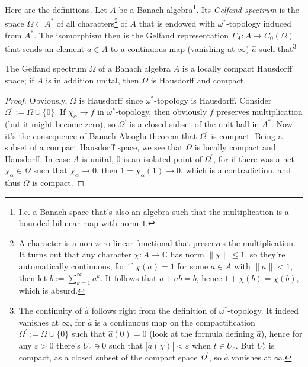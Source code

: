 Here are the definitions. Let $A$ be a Banach algebra\footnote{I.e. a Banach space that's also an algebra such that the multiplication is a bounded bilinear map with norm $1$.}. Its \emph{Gelfand spectrum} is the space $\Omega \subset A^*$ of all characters\footnote{A character is a non-zero linear functional that preserves the multiplication. It turns out that any character $\chi : A \rightarrow \mathbb C$ has norm $\|\chi\| \leq 1$, so they're automatically continuous, for if $\chi(a) = 1$ for some $a \in A$ with $\|a\| <1$, then let $b:=\sum_{k=1}^\infty a^k$. It follows that $a + ab = b$, hence $1 + \chi(b) = \chi(b)$, which is absurd. } of $A$  that is endowed with $\omega^*$-topology induced from $A^*$. The isomorphism then is the Gelfand representation $\Gamma_A : A \rightarrow C_0(\Omega)$ that sends an element $a \in A$ to a continuous map (vanishing at $\infty$) $\hat a$ such that\footnote{The continuity of $\hat a$ follows right from the definition of $\omega^*$-topology. It indeed vanishes at $\infty$, for $\hat a$ is a continuous map on the compactification $\Omega^\prime := \Omega \cup \{0\}$ such that $\hat{a}(0) = 0$ (look at the formula defining $\hat{a}$), hence for any $\varepsilon > 0$ there's $U_{\varepsilon} \ni 0$ such that $|\hat{a}(\chi)| < \varepsilon$ when $t \in U_{\varepsilon}$. But $U_{\varepsilon}^c$ is compact, as a closed subset of the compact space $\Omega^\prime$, so $\hat a$ vanishes at $\infty$.}
\begin{proposition}
The Gelfand spectrum $\Omega$ of a Banach algebra $A$ is a locally compact Hausdorff space; if $A$ is in addition unital, then $\Omega$ is Hausdorff and compact.
\end{proposition}
\begin{proof}
Obviously, $\Omega$ is Hausdorff since $\omega^*$-topology is Hausdorff. Consider $\Omega^\prime := \Omega \cup \{0\}$. If $\chi_\alpha \rightarrow f$ in $\omega^*$-topology, then obviously $f$ preserves multiplication (but it might become zero), so $\Omega^\prime$ is a closed subset of the unit ball in $A^*$. Now it's the consequence of Banach-Alaoglu theorem that $\Omega^\prime$ is compact. Being a subset of a compact Hausdorff space, we see that $\Omega$ is locally compact and Hausdorff. In case $A$ is unital, $0$ is an isolated point of $\Omega^\prime$, for if there was a net $\chi_\alpha \in \Omega$ such that $\chi_\alpha \rightarrow 0$, then $1 = \chi_\alpha(1) \rightarrow 0$, which is a contradiction, and thus $\Omega$ is compact.
\end{proof}

